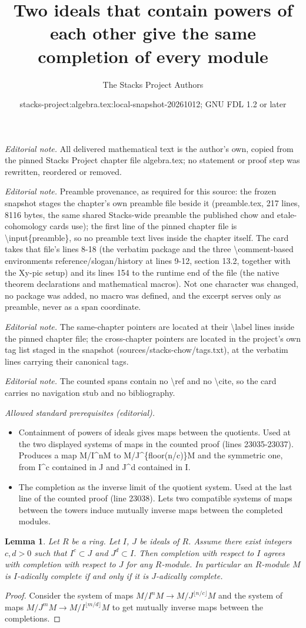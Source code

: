 \documentclass[10pt,a4paper]{amsart}
\title{Two ideals that contain powers of each other give the same completion of every module}
\author{The Stacks Project Authors}
\date{stacks-project:algebra.tex:local-snapshot-20261012; GNU FDL 1.2 or later}
\theoremstyle{plain}
\newtheorem{lemma}[subsection]{Lemma}
\theoremstyle{definition}
\theoremstyle{remark}
\numberwithin{equation}{subsection}
\begin{document}
\maketitle
\noindent\textit{Editorial note.} All delivered mathematical text is the author's own, copied from the pinned Stacks Project chapter file algebra.tex; no statement or proof step was rewritten, reordered or removed.\par\medskip
\noindent\textit{Editorial note.} Preamble provenance, as required for this source: the frozen snapshot stages the chapter's own preamble file beside it (preamble.tex, 217 lines, 8116 bytes, the same shared Stacks-wide preamble the published chow and etale-cohomology cards use); the first line of the pinned chapter file is \textbackslash{}input\{preamble\}, so no preamble text lives inside the chapter itself. The card takes that file's lines 8-18 (the verbatim package and the three \textbackslash{}comment-based environments reference/slogan/history at lines 9-12, section 13.2, together with the Xy-pic setup) and its lines 154 to the runtime end of the file (the native theorem declarations and mathematical macros). Not one character was changed, no package was added, no macro was defined, and the excerpt serves only as preamble, never as a span coordinate.\par\medskip
\noindent\textit{Editorial note.} The same-chapter pointers are located at their \textbackslash{}label lines inside the pinned chapter file; the cross-chapter pointers are located in the project's own tag list staged in the snapshot (sources/stacks-chow/tags.txt), at the verbatim lines carrying their canonical tags.\par\medskip
\noindent\textit{Editorial note.} The counted spans contain no \textbackslash{}ref and no \textbackslash{}cite, so the card carries no navigation stub and no bibliography.\par\medskip
\noindent\textit{Allowed standard prerequisites (editorial).}\begin{itemize}
\item Containment of powers of ideals gives maps between the quotients. Used at the two displayed systems of maps in the counted proof (lines 23035-23037). Produces a map M/I\textasciicircum{}nM to M/J\textasciicircum{}\{floor(n/c)\}M and the symmetric one, from I\textasciicircum{}c contained in J and J\textasciicircum{}d contained in I.
\item The completion as the inverse limit of the quotient system. Used at the last line of the counted proof (line 23038). Lets two compatible systems of maps between the towers induce mutually inverse maps between the completed modules.
\end{itemize}\medskip
\begin{lemma}
\label{lemma-change-ideal-completion}
Let $R$ be a ring.
Let $I$, $J$ be ideals of $R$.
Assume there exist integers $c, d > 0$ such that
$I^c \subset J$ and $J^d \subset I$.
Then completion with respect to $I$ agrees with completion
with respect to $J$ for any $R$-module.
In particular an $R$-module $M$ is $I$-adically complete
if and only if it is $J$-adically complete.
\end{lemma}

\begin{proof}
Consider the system of maps
$M/I^nM \to M/J^{\lfloor n/c \rfloor}M$ and
the system of maps $M/J^mM \to M/I^{\lfloor m/d \rfloor}M$
to get mutually inverse maps between the completions.
\end{proof}
\end{document}
